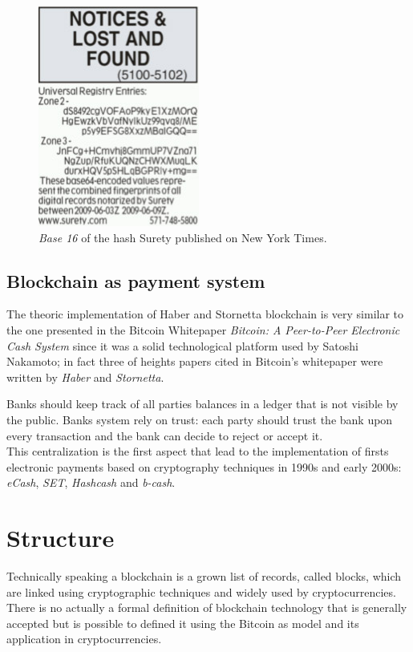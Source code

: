 \begin{figure}[!h]
    \centering
    \includegraphics[scale=0.5]{images/nyt.jpg}
    \caption{\textit{Base 16} of the hash Surety published on New York Times.}
\end{figure}

\subsection{Blockchain as payment system}

The theoric implementation of Haber and Stornetta blockchain is very similar to the one presented in the Bitcoin Whitepaper \textit{Bitcoin: A Peer-to-Peer Electronic Cash System}\cite{bitcoin} since it was a solid technological platform used by Satoshi Nakamoto; in fact three of heights papers cited in Bitcoin's whitepaper were written by \textit{Haber} and \textit{Stornetta}.

Banks should keep track of all parties balances in a ledger that is not visible by the public. Banks system rely on trust: each party should trust the bank upon every transaction and the bank can decide to reject or accept it.\\
This centralization is the first aspect that lead to the implementation of firsts electronic payments based on cryptography techniques in 1990s and early 2000s: \textit{eCash}, \textit{SET}, \textit{Hashcash} and \textit{b-cash}.


\section{Structure}

Technically speaking a blockchain is a grown list of records, called blocks, which are linked using cryptographic techniques and widely used by cryptocurrencies.\\
There is no actually a formal definition of blockchain technology that is generally accepted but is possible to defined it using the Bitcoin as model and its application in cryptocurrencies.\\

